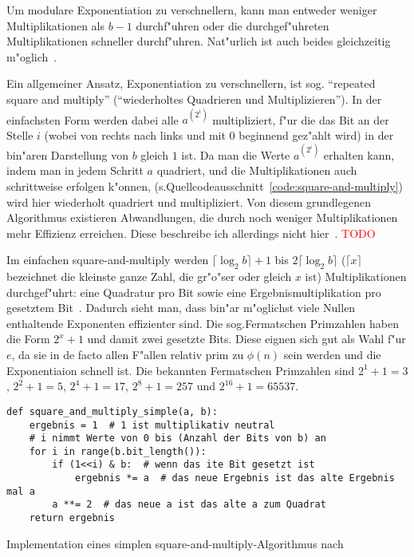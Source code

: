 \documentclass[12pt]{article}
\newcommand{\todo}[1]{\textcolor{red}{\mbox{TODO}}\marginpar{\textcolor{red}{#1}}}
\begin{document}
Um modulare Exponentiation zu verschnellern, kann man entweder weniger Multiplikationen
als $b-1$ durchf"uhren oder die durchgef"uhreten Multiplikationen schneller durchf"uhren.
Nat"urlich ist auch beides gleichzeitig m"oglich~\cite{hac}.

Ein allgemeiner Ansatz, Exponentiation zu verschnellern, ist sog.\@
"`repeated square and multiply"' ("`wiederholtes Quadrieren und Multiplizieren"').
In der einfachsten Form werden dabei alle $a^{(2^i)}$ multipliziert,
f"ur die das Bit an der Stelle $i$ (wobei von rechts nach links und mit 0 beginnend gez"ahlt wird)
in der bin"aren Darstellung von $b$ gleich $1$ ist.
Da man die Werte $a^{(2^i)}$ erhalten kann, indem man in jedem Schritt $a$ quadriert,
und die Multiplikationen auch schrittweise erfolgen k"onnen, (s.\@ Quellcodeausschnitt~\ref{code:square-and-multiply})
wird hier wiederholt quadriert und multipliziert.
Von diesem grundlegenen Algorithmus existieren Abwandlungen,
die durch noch weniger Multiplikationen mehr Effizienz erreichen.
Diese beschreibe ich allerdings nicht hier~\cite{hac}. \todo{Anhang?}

Im einfachen square-and-multiply werden $\lceil \log_2 b \rceil + 1$ bis $2 \lceil \log_2 b \rceil$
($\lceil x \rceil$ bezeichnet die kleinste ganze Zahl, die gr"o"ser oder gleich $x$ ist)
Multiplikationen durchgef"uhrt: eine Quadratur pro Bit sowie eine Ergebnismultiplikation pro ge\-setz\-tem Bit~\cite{hac}.
Dadurch sieht man, dass bin"ar m"oglichst viele Nullen enthaltende Exponenten effizienter sind.
Die sog.\@ Fermatschen Primzahlen haben die Form $2^x + 1$ und damit zwei gesetzte Bits.
Diese eignen sich gut als Wahl f"ur $e$, da sie in de facto allen F"allen relativ prim zu
$\phi(n)$ sein werden und die Exponentiaion schnell ist.
Die bekannten Fermatschen Primzahlen sind $2^1 + 1 = 3$, $2^2+1 = 5$, $2^4 + 1 = 17$, $2^8+1 = 257$ und $2^{16} + 1 = 65537$.

\begin{code-snip}
\begin{lstlisting}
def square_and_multiply_simple(a, b):
    ergebnis = 1  # 1 ist multiplikativ neutral
    # i nimmt Werte von 0 bis (Anzahl der Bits von b) an
    for i in range(b.bit_length()):
        if (1<<i) & b:  # wenn das ite Bit gesetzt ist
            ergebnis *= a  # das neue Ergebnis ist das alte Ergebnis mal a
        a **= 2  # das neue a ist das alte a zum Quadrat
    return ergebnis
\end{lstlisting}
\caption{Implementation eines simplen square-and-multiply-Algorithmus nach~\cite{hac}}
\label{code:square-and-multiply}
\end{code-snip}
\end{document}
